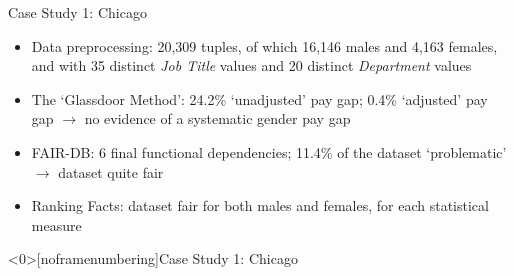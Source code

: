 \documentclass[usenames,dvipsnames]{beamer}
\begin{document}
    
    \begin{frame}{Case Study 1: Chicago}
        \begin{itemize}
            \item \textcolor{defaultBlue}{Data preprocessing}: 20,309 tuples, of which 16,146 males and 4,163 females, and with 35 distinct \textit{Job Title} values and 20 distinct \textit{Department} values\newline
            \item \textcolor{defaultBlue}{The `Glassdoor Method'}: 24.2\% `unadjusted' pay gap; 0.4\% `adjusted' pay gap $\rightarrow$ no evidence of a systematic gender pay gap
            \item \textcolor{defaultBlue}{FAIR-DB}: 6 final functional dependencies; 11.4\% of the dataset `problematic' $\rightarrow$ dataset quite fair
            \item \textcolor{defaultBlue}{Ranking Facts}: dataset fair for both males and females, for each statistical measure
        \end{itemize}
    \end{frame}
    
    
    \begin{frame}<0>[noframenumbering]{Case Study 1: Chicago}
        \begin{figure}
            \medskip\centering
            \hfill
        \end{figure}
    \end{frame}
    
\end{document}
